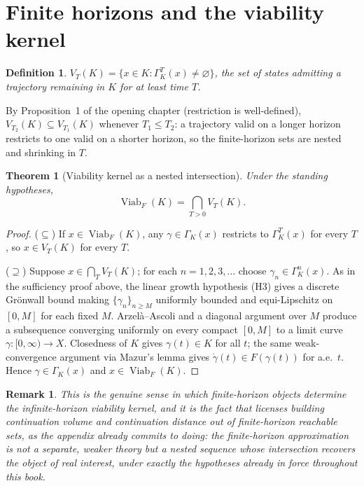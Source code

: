 \documentclass[11pt]{report}
\newtheorem{theorem}{Theorem}[chapter]
\newtheorem{definition}{Definition}[chapter]
\newtheorem{remark}{Remark}[chapter]
\begin{document}
\section*{Finite horizons and the viability kernel}

\begin{definition}
$V_T(K) = \{x \in K : \Gamma_K^T(x) \neq \varnothing\}$, the set of
states admitting a trajectory remaining in $K$ for at least time $T$.
\end{definition}

By Proposition~1 of the opening chapter (restriction is well-defined),
$V_{T_2}(K) \subseteq V_{T_1}(K)$ whenever $T_1 \leq T_2$: a trajectory
valid on a longer horizon restricts to one valid on a shorter horizon,
so the finite-horizon sets are nested and shrinking in $T$.

\begin{theorem}[Viability kernel as a nested intersection]
Under the standing hypotheses,
\[
\operatorname{Viab}_F(K) = \bigcap_{T > 0} V_T(K).
\]
\end{theorem}
\begin{proof}
($\subseteq$) If $x \in \operatorname{Viab}_F(K)$, any
$\gamma \in \Gamma_K(x)$ restricts to $\Gamma_K^T(x)$ for every $T$, so
$x \in V_T(K)$ for every $T$.

($\supseteq$) Suppose $x \in \bigcap_T V_T(K)$; for each $n = 1,2,3,\dots$
choose $\gamma_n \in \Gamma_K^n(x)$. As in the sufficiency proof above,
the linear growth hypothesis (H3) gives a discrete Gr\"onwall bound
making $\{\gamma_n\}_{n \geq M}$ uniformly bounded and equi-Lipschitz on
$[0,M]$ for each fixed $M$. Arzel\`a--Ascoli and a diagonal argument over
$M$ produce a subsequence converging uniformly on every compact
$[0,M]$ to a limit curve $\gamma : [0,\infty) \to X$. Closedness of $K$
gives $\gamma(t) \in K$ for all $t$; the same weak-convergence argument
via Mazur's lemma gives $\dot\gamma(t) \in F(\gamma(t))$ for a.e.\ $t$.
Hence $\gamma \in \Gamma_K(x)$ and $x \in \operatorname{Viab}_F(K)$.
\end{proof}

\begin{remark}
This is the genuine sense in which finite-horizon objects determine the
infinite-horizon viability kernel, and it is the fact that licenses
building continuation volume and continuation distance out of
finite-horizon reachable sets, as the appendix already commits to doing:
the finite-horizon approximation is not a separate, weaker theory but a
nested sequence whose intersection recovers the object of real interest,
under exactly the hypotheses already in force throughout this book.
\end{remark}
\end{document}
